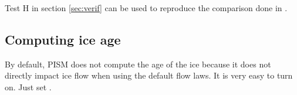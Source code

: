 Test H in section \ref{sec:verif} can be used to reproduce the comparison done in \cite{BLKfastearth}.


\subsection{Computing ice age} \label{subsect:age}

By default, PISM does not compute the age of the ice because it does not directly impact ice flow when using the default flow laws. It is very easy to turn on.  Just set .



